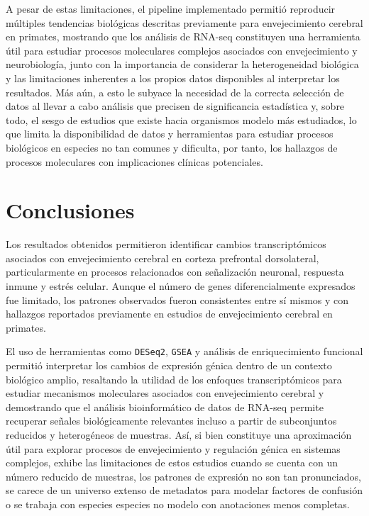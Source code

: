 \documentclass[
  12pt,
  letterpaper,
  DIV=11,
  numbers=noendperiod]{scrartcl}
\begin{document}
A pesar de estas limitaciones, el pipeline implementado permitió
reproducir múltiples tendencias biológicas descritas previamente para
envejecimiento cerebral en primates, mostrando que los análisis de
RNA-seq constituyen una herramienta útil para estudiar procesos
moleculares complejos asociados con envejecimiento y neurobiología,
junto con la importancia de considerar la heterogeneidad biológica y las
limitaciones inherentes a los propios datos disponibles al interpretar
los resultados. Más aún, a esto le subyace la necesidad de la correcta
selección de datos al llevar a cabo análisis que precisen de
significancia estadística y, sobre todo, el sesgo de estudios que existe
hacia organismos modelo más estudiados, lo que limita la disponibilidad
de datos y herramientas para estudiar procesos biológicos en especies no
tan comunes y dificulta, por tanto, los hallazgos de procesos
moleculares con implicaciones clínicas potenciales.

\section{Conclusiones}\label{conclusiones}

Los resultados obtenidos permitieron identificar cambios
transcriptómicos asociados con envejecimiento cerebral en corteza
prefrontal dorsolateral, particularmente en procesos relacionados con
señalización neuronal, respuesta inmune y estrés celular. Aunque el
número de genes diferencialmente expresados fue limitado, los patrones
observados fueron consistentes entre sí mismos y con hallazgos
reportados previamente en estudios de envejecimiento cerebral en
primates.

El uso de herramientas como \texttt{DESeq2}, \texttt{GSEA} y análisis de
enriquecimiento funcional permitió interpretar los cambios de expresión
génica dentro de un contexto biológico amplio, resaltando la utilidad de
los enfoques transcriptómicos para estudiar mecanismos moleculares
asociados con envejecimiento cerebral y demostrando que el análisis
bioinformático de datos de RNA-seq permite recuperar señales
biológicamente relevantes incluso a partir de subconjuntos reducidos y
heterogéneos de muestras. Así, si bien constituye una aproximación útil
para explorar procesos de envejecimiento y regulación génica en sistemas
complejos, exhibe las limitaciones de estos estudios cuando se cuenta
con un número reducido de muestras, los patrones de expresión no son tan
pronunciados, se carece de un universo extenso de metadatos para modelar
factores de confusión o se trabaja con especies especies no modelo con
anotaciones menos completas.
\end{document}
